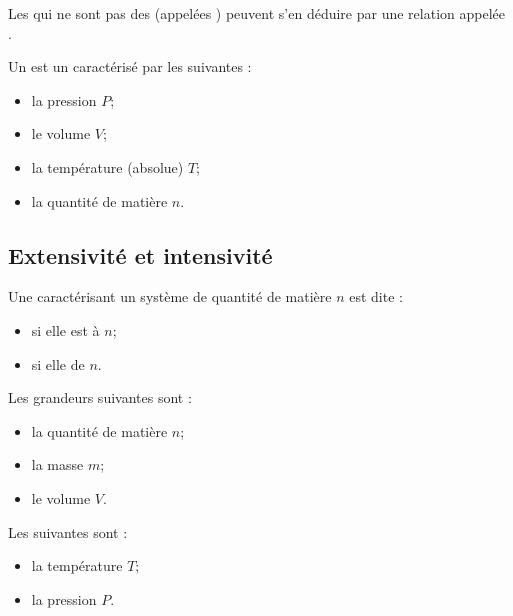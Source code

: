 \begin{propriete}[admis]
Les  qui ne sont pas des  (appelées ) peuvent s'en déduire par une relation appelée .
\end{propriete}

\begin{definition}
Un  est un  caractérisé par les  suivantes :
\begin{itemize}
\item la pression $P$;
\item le volume $V$;
\item la température (absolue) $T$;
\item la quantité de matière $n$.
\end{itemize}
\end{definition}



\subsection{Extensivité et intensivité}

\begin{definitions}
Une  caractérisant un système de quantité de matière $n$ est dite :
\begin{itemize}
\item {} si elle est  à $n$;
\item {} si elle  de $n$.
\end{itemize}
\end{definitions}

\begin{exemples}
Les grandeurs suivantes sont  :
\begin{itemize}
\item la quantité de matière $n$;
\item la masse $m$;
\item le volume $V$.
\end{itemize}

\noindent Les suivantes sont  :
\begin{itemize}
\item la température $T$;
\item la pression $P$.
\end{itemize}
\end{exemples}

